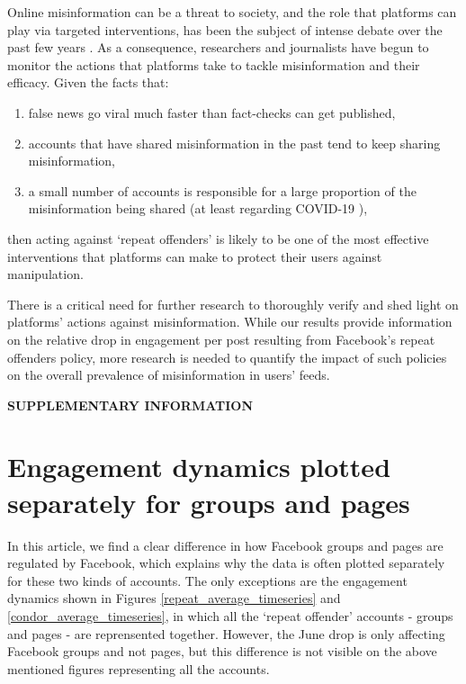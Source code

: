 \documentclass[review]{elsarticle}
\newcommand{\beginsupplement}{%
        \setcounter{table}{0}
        \renewcommand{\thetable}{S\arabic{table}}%
        \setcounter{figure}{0}
        \renewcommand{\thefigure}{S\arabic{figure}}%
     }
\begin{document}
{Online misinformation can be a threat to society, and the role that platforms can play via targeted interventions, has been the subject of intense debate over the past few years \citep{rogers2020deplatforming}. 
As a consequence, researchers \citep{mena2020cleaning, yaqub2020effects} and journalists \citep{FacebookPartisanBias, FacebookCivilityGrowth} have begun to monitor the actions that platforms take to tackle misinformation and their efficacy.
Given the facts that:
\begin{enumerate}[(1)]
\item false news go viral much faster than fact-checks can get published,
\item accounts that have shared misinformation in the past tend to keep sharing misinformation,
\item a small number of accounts is responsible for a large proportion of the misinformation being shared (at least regarding COVID-19 \citep{disinformationDozen}),
\end{enumerate}
then acting against `repeat offenders' is likely to be one of the most effective interventions that platforms can make to protect their users against manipulation.

There is a critical need for further research to thoroughly verify and shed light on platforms' actions against misinformation. 
While our results provide information on the relative drop in engagement per post resulting from Facebook’s repeat offenders policy, more research is needed to quantify the impact of such policies on the overall prevalence of misinformation in users’ feeds.




\newpage

\beginsupplement

\textbf{SUPPLEMENTARY INFORMATION}

\section*{Engagement dynamics plotted separately for groups and pages}

In this article, we find a clear difference in how Facebook groups and pages are regulated by Facebook, which explains why the data is often plotted separately for these two kinds of accounts. 
The only exceptions are the engagement dynamics shown in Figures \ref{repeat_average_timeseries} and \ref{condor_average_timeseries}, in which all the `repeat offender' accounts - groups and pages - are reprensented together.
However, the June drop is only affecting Facebook groups and not pages, but this difference is not visible on the above mentioned figures representing all the accounts.

}
\end{document}
